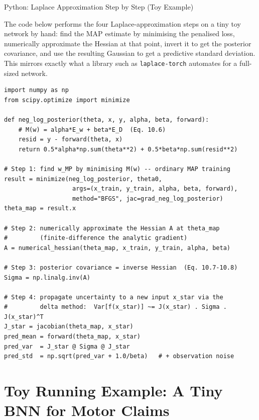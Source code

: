 \documentclass[aspectratio=169,10pt]{beamer}
\begin{document}
\begin{frame}[fragile]{Python: Laplace Approximation Step by Step (Toy Example)}

The code below performs the four Laplace-approximation steps on a tiny toy
network by hand: find the MAP estimate by minimising the penalised loss,
numerically approximate the Hessian at that point, invert it to get the
posterior covariance, and use the resulting Gaussian to get a predictive
standard deviation. This mirrors exactly what a library such as
\texttt{laplace-torch} automates for a full-sized network.

\begin{lstlisting}[caption={MAP, Hessian, and predictive uncertainty by hand}]
import numpy as np
from scipy.optimize import minimize

def neg_log_posterior(theta, x, y, alpha, beta, forward):
    # M(w) = alpha*E_w + beta*E_D  (Eq. 10.6)
    resid = y - forward(theta, x)
    return 0.5*alpha*np.sum(theta**2) + 0.5*beta*np.sum(resid**2)

# Step 1: find w_MP by minimising M(w) -- ordinary MAP training
result = minimize(neg_log_posterior, theta0,
                   args=(x_train, y_train, alpha, beta, forward),
                   method="BFGS", jac=grad_neg_log_posterior)
theta_map = result.x

# Step 2: numerically approximate the Hessian A at theta_map
#         (finite-difference the analytic gradient)
A = numerical_hessian(theta_map, x_train, y_train, alpha, beta)

# Step 3: posterior covariance = inverse Hessian  (Eq. 10.7-10.8)
Sigma = np.linalg.inv(A)

# Step 4: propagate uncertainty to a new input x_star via the
#         delta method:  Var[f(x_star)] ~= J(x_star) . Sigma . J(x_star)^T
J_star = jacobian(theta_map, x_star)
pred_mean = forward(theta_map, x_star)
pred_var  = J_star @ Sigma @ J_star
pred_std  = np.sqrt(pred_var + 1.0/beta)   # + observation noise
\end{lstlisting}

\end{frame}

\section{Toy Running Example: A Tiny BNN for Motor Claims}
\end{document}
